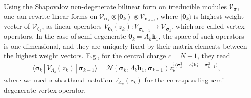 \documentclass[pdftex]{sigma}
\newcommand{\bs}{\boldsymbol}
\newcommand{\la}{\langle} \newcommand{\ra}{\rangle}
\numberwithin{equation}{section}
\begin{document}
Using the Shapovalov non-degenerate bilinear form on irreducible modules $\mathcal{V}_{\bs \sigma}$, one can rewrite linear forms on $\mathcal{V}_{\bs \sigma_k}\otimes \left|{\bs \theta_k}\right\ra \otimes \mathcal{V}_{\bs \sigma_{k-1}}$, where $|{\bs \theta_k}\ra $ is highest weight vector of $\mathcal{V}_{\bs \theta_k}$, as linear operators $V_{\bs \theta_k} (z_k)\colon \mathcal{V}_{\bs \sigma_{k-1}} \to \mathcal{V}_{\bs \sigma_{k}}$, which are called vertex operators. In the case of semi-degenerate $\bs \theta_k=\Lambda_k \bs h_1$, the space of such operators is one-dimensional, and they are uniquely fixed by their matrix elements between the highest weight vectors. E.g., for the central charge $c=N-1$, they read
\begin{gather}\label{VOnorm}
\big\la \bs \sigma_{k}\,|\, V_{\Lambda_k}(z_k)\,|\, \bs \sigma_{k-1}\big\ra=\mathcal{N}(\bs \sigma_{k}, \Lambda_k \bs h_1, \bs \sigma_{k-1})
z_k^{\frac12\big(\bs \sigma_{k}^2-\Lambda_k^2 \bs h_1^2-\bs \sigma_{k-1}^2\big)},
\end{gather}
where we used a shorthand notation $V_{\Lambda_k}(z_k)$ for the corresponding semi-degenerate vertex ope\-rator.
\end{document}
